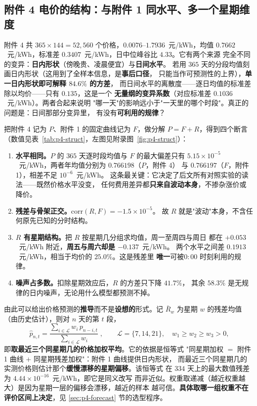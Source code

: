 \subsection{附件 4 电价的结构：与附件 1 同水平、多一个星期维度}
\label{sec:p4-struct}

附件 4 共 $365\times144=52{,}560$ 个价格，$0.0076$--$1.7936$~元/kWh，均值
$0.7662$~元/kWh，标准差 $0.3407$~元/kWh，日中位峰谷比 $4.33$。它有两个来源
完全不同的变异：\textbf{日内形状}（傍晚贵、凌晨便宜）与\textbf{日间水平}。
若用 $365$ 天的分段均值刻画日内形状（这用到了全样本信息，是\textbf{事后口径}，
只能当作可预测性的上界），\textbf{单一日内形状即可解释 $84.6\%$ 的方差}，
而日间水平的离散度——逐日均值的标准差除以均价——只有 $0.135$，这是一个
\textbf{无量纲的变异系数}（对应标准差 $0.1036$~元/kWh）。两者合起来说明
"哪一天"的影响远小于"一天里的哪个时段"。真正的问题是：日间那部分变异里，
有没有\textbf{可利用的规律}？

把附件 4 记为 $P$、附件 1 的固定曲线记为 $F$，做分解 $P=F+R$，得到四个断言
（数值见表~\ref{tab:p4-struct}，左图见附录图~\ref{fig:p4-struct}）：

\begin{enumerate}
  \item \textbf{水平相同。}$P$ 的 $365$ 天逐时段均值与 $F$ 的最大偏差只有
        $5.15\times10^{-5}$~元/kWh，两者年均值分别为 $0.766198$（$P$，附件 4）
        与 $0.766197$（$F$，附件 1），相差不足 $10^{-6}$~元/kWh。
        这条最关键：它决定了后文所有对照实验的读法——既然价格水平没变，
        任何费用差异都\textbf{只来自波动本身}，不掺杂涨价或降价。
  \item \textbf{残差与骨架正交。}$\mathrm{corr}(R,F)=-1.5\times10^{-5}$。
        故 $R$ 就是"波动"本身，不含任何原先已知的分时结构。
  \item \textbf{$R$ 有星期结构。}把 $R$ 按星期几分组求均值，周一至周四与周日
        都在 $+0.053$~元/kWh 附近，\textbf{周五与周六却是 $-0.137$}~元/kWh。
        两个水平之间差 $0.1913$~元/kWh，相当于均价的 $25.0\%$。这是残差里
        \textbf{唯一}可被$0{:}00$ 时刻利用的规律。
  \item \textbf{噪声占多数。}扣除星期效应后，$R$ 的方差只下降 $41.7\%$，
        其余 $58.3\%$ 是无规律的日内噪声，无论用什么模型都预测不掉。
\end{enumerate}

由此可以给出价格预测的\textbf{推导}而不是\textbf{设想的}形式。记 $\bar R_{w}$
为星期 $w$ 的残差均值（由历史估计），则对 $n$ 天的第 $t$ 段，
$$
\boxed{\;
\widehat p_{n,t}=\frac{\sum_{i\in\mathcal L}w_i\,p_{n-i,t}}
{\sum_{i\in\mathcal L}w_i}
\;},\qquad \mathcal L=\{7,14,21\},\quad w_1\ge w_2\ge w_3>0,
\label{eq:p4-price}
$$
即\textbf{取最近三个同星期几的价格加权平均}。它的依据是恒等式
"同星期加权 $=$ 附件 1 曲线 $+$ 同星期残差加权"：附件 1 曲线提供日内形状，
而最近三个同星期几的实测价格则估计那个\textbf{缓慢漂移的星期偏移}。该恒等式
在 $334$ 天上的最大数值残差为 $4.44\times10^{-16}$~元/kWh，即它是同义改写
而非近似。权重取递减（越近权重越大）是因为星期一层的偏移会漂移，越近的样本
越可信。\textbf{具体取哪一组权重不在评价区间上决定}，见
\ref{sec:p4-forecast} 节的选型程序。

